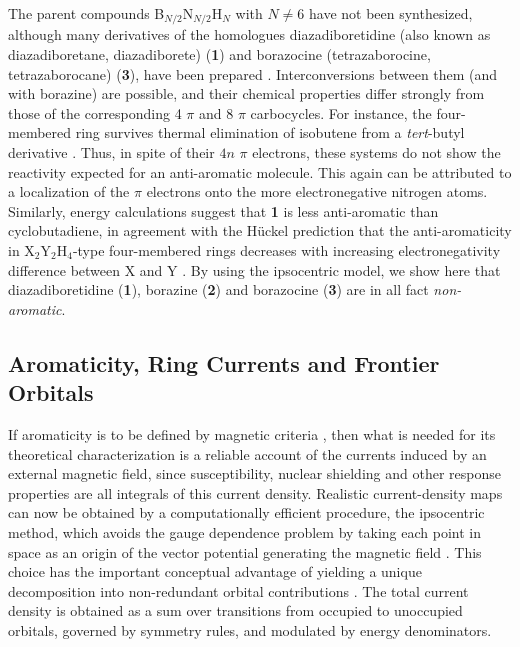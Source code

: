 The parent compounds B$_{N/2}$N$_{N/2}$H$_N$ with $N \ne 6$ have not been synthesized, although many derivatives of the homologues diazadiboretidine (also known as diazadiboretane, diazadiborete) (\textbf{1}) and borazocine (tetrazaborocine, tetrazaborocane) (\textbf{3}), have been prepared \cite{r14}. Interconversions between them (and with borazine) are possible, and their chemical properties differ strongly from those of the corresponding 4 $\pi$ and 8 $\pi$ carbocycles.  For instance, the four-membered ring survives thermal elimination of isobutene from a \textit{tert}-butyl derivative \cite{r14}.  Thus, in spite of their $4n$ $\pi$ electrons, these systems do not show the reactivity expected for an anti-aromatic molecule.  This again can be attributed to a localization of the $\pi$ electrons onto the more electronegative nitrogen atoms.  Similarly, energy calculations \cite{r11b,r15} suggest that \textbf{1} is less anti-aromatic than cyclobutadiene, in agreement with the H\"uckel prediction that
the anti-aromaticity in X$_2$Y$_2$H$_4$-type four-membered rings decreases with increasing electronegativity difference between X and Y \cite{r16}.  By using the ipsocentric model, we show here that diazadiboretidine (\textbf{1}), borazine (\textbf{2}) and borazocine (\textbf{3}) are in all fact \textit{non-aromatic}.

\subsection{Aromaticity, Ring Currents and Frontier Orbitals}

If aromaticity is to be defined by magnetic criteria \cite{r09}, then what is needed for its theoretical characterization is a reliable account of the currents induced by an external magnetic field, since susceptibility, nuclear shielding and other response properties are all integrals of this current density.  Realistic current-density maps can now be obtained by a computationally efficient procedure, the ipsocentric method, which avoids the gauge dependence problem by taking each point in space as an origin of the vector potential generating the magnetic field \cite{r17,r18}. This choice has the important conceptual advantage of yielding a unique decomposition into non-redundant orbital contributions \cite{r03}. The total current density is obtained as a sum over transitions from occupied to unoccupied orbitals, governed by symmetry rules, and modulated by energy denominators.

